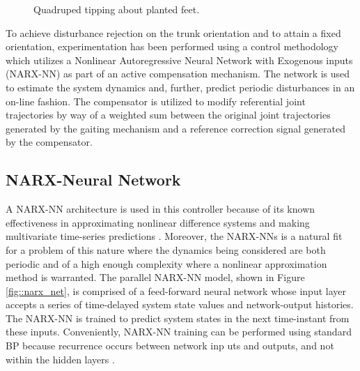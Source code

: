 			\begin{figure}[h!]
			\centering
				\caption{ Quadruped tipping about planted feet. }
				\label{fig::quadruped_walking}
			\end{figure}

		To achieve disturbance rejection on the trunk orientation and to attain a fixed orientation, experimentation has been performed using a control methodology which utilizes a Nonlinear Autoregressive Neural Network with Exogenous inputs (NARX-NN) as part of an active compensation mechanism. The network is used to estimate the system dynamics and, further, predict periodic disturbances in an on-line fashion. The compensator is utilized to modify referential joint trajectories by way of a weighted sum between the original joint trajectories generated by the gaiting mechanism and a reference correction signal generated by the compensator.

		\subsection{NARX-Neural Network}

			A NARX-NN architecture is used in this controller because of  its known effectiveness in approximating nonlinear difference systems and making multivariate time-series predictions \cite{Tsungnan1996,ChenBillings1990,Hihi1996,Billings2013}. Moreover, the NARX-NNs is a natural fit for a problem of this nature where the dynamics being considered are both periodic and of a high enough complexity where a nonlinear approximation method is warranted. The parallel NARX-NN model, shown in Figure \ref{fig::narx_net}, is comprised of a feed-forward neural network whose input layer accepts a series of time-delayed system state values and network-output histories. The NARX-NN is trained to predict system states in the next time-instant from these inputs. Conveniently, NARX-NN training can be performed using standard BP because recurrence occurs between network inp
uts and outputs, and not within the hidden layers \cite{Nelles2001}.

